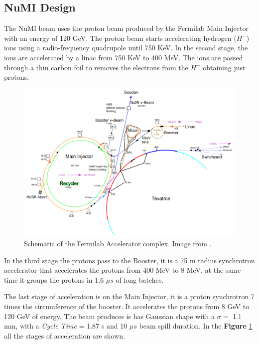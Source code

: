 \subsection{NuMI Design}

The NuMI beam uses the proton beam produced by the Fermilab Main Injector with an energy of 120 GeV. The proton beam starts accelerating hydrogen ($H^-$) ions using a radio-frequency quadrupole until 750 KeV. In the second stage, the ions are accelerated by a linac from 750 KeV to 400 MeV. The ions are passed through a thin carbon foil to removes the electrons from the $H^-$ obtaining just protons. 

\begin{figure}[!h]
\centering
\includegraphics[scale=0.29]{Figures/Chapter2/AcceleratorComplex.png}
        \caption{Schematic of the Fermilab Accelerator complex. Image from \cite{Numi}.} 
\label{fig:MnvExp:NuMI:SchematicMainInjector}
\end{figure}

In the third stage the protons pass to the Booster, it is a 75 m radius synchrotron accelerator that accelerates the protons from 400 MeV to 8 MeV, at the same time it groups the protons in 1.6 $\mu s$ of long batches. 

The last stage of acceleration is on the Main Injector, it is a proton synchrotron 7 times the circumference of the booster. It accelerates the protons from 8 GeV to 120 GeV of energy. The beam produces is has Gaussian shape with a $\sigma =$ 1.1 mm, with a \textit{Cycle Time} = 1.87 s and 10 $\mu s$ beam spill duration. In the  \textbf{Figure} \ref{fig:MnvExp:NuMI:SchematicMainInjector} all the stages of acceleration are shown.

